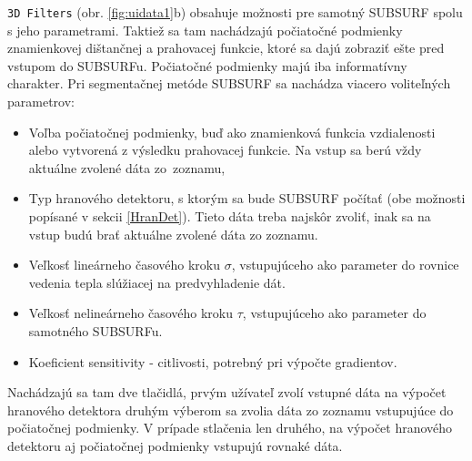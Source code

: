 \documentclass[a4paper,11pt,oneside]{article}%
\begin{document}
\texttt{3D Filters} (obr. \ref{fig:uidata1}b) obsahuje možnosti pre samotný SUBSURF spolu s jeho parametrami. Taktiež sa tam nachádzajú počiatočné podmienky znamienkovej dištančnej a prahovacej funkcie, ktoré sa dajú zobraziť ešte pred vstupom do SUBSURFu. Počiatočné podmienky majú iba informatívny charakter. Pri segmentačnej metóde SUBSURF sa nachádza viacero voliteľných parametrov:
\begin{itemize}
\item Voľba počiatočnej podmienky, buď ako znamienková funkcia vzdialenosti alebo  vytvorená z výsledku prahovacej funkcie. Na vstup sa berú vždy aktuálne zvolené dáta zo~zoznamu,
\item Typ hranového detektoru, s ktorým sa bude SUBSURF počítať (obe možnosti popísané v sekcii \ref{HranDet}). Tieto dáta treba najskôr zvoliť, inak sa na vstup budú brať aktuálne zvolené dáta zo zoznamu.
\item Veľkosť lineárneho časového kroku $\sigma$, vstupujúceho ako parameter do rovnice vedenia tepla slúžiacej na predvyhladenie dát.  
\item Veľkosť nelineárneho časového kroku $\tau$, vstupujúceho ako parameter do samotného SUBSURFu.  
\item Koeficient sensitivity - citlivosti, potrebný pri výpočte gradientov.
\end{itemize}

Nachádzajú sa tam dve tlačidlá, prvým užívateľ zvolí vstupné dáta na výpočet hranového detektora  druhým výberom sa zvolia dáta zo zoznamu vstupujúce do počiatočnej podmienky. V prípade stlačenia len druhého, na výpočet hranového detektoru aj počiatočnej podmienky vstupujú rovnaké dáta. 
\end{document}
